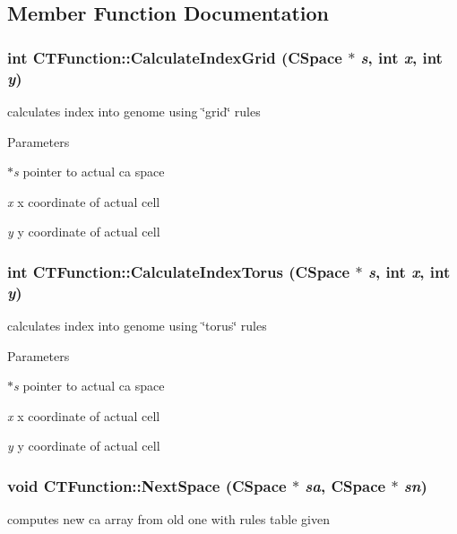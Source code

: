 \subsection{Member Function Documentation}
\hypertarget{classCTFunction_a337b7b2bc4aa55fba6966ed732292836}{
\subsubsection[{CalculateIndexGrid}]{\setlength{\rightskip}{0pt plus 5cm}int CTFunction::CalculateIndexGrid ({\bf CSpace} $\ast$ {\em s}, \/  int {\em x}, \/  int {\em y})}}
\label{classCTFunction_a337b7b2bc4aa55fba6966ed732292836}
calculates index into genome using \char`\"{}grid\char`\"{} rules


\begin{DoxyParams}{Parameters}
\item[{\em $\ast$s}]pointer to actual ca space \item[{\em x}]x coordinate of actual cell \item[{\em y}]y coordinate of actual cell \end{DoxyParams}
\hypertarget{classCTFunction_a46be389e8f79729395cb918ab58e63c0}{
\subsubsection[{CalculateIndexTorus}]{\setlength{\rightskip}{0pt plus 5cm}int CTFunction::CalculateIndexTorus ({\bf CSpace} $\ast$ {\em s}, \/  int {\em x}, \/  int {\em y})}}
\label{classCTFunction_a46be389e8f79729395cb918ab58e63c0}
calculates index into genome using \char`\"{}torus\char`\"{} rules


\begin{DoxyParams}{Parameters}
\item[{\em $\ast$s}]pointer to actual ca space \item[{\em x}]x coordinate of actual cell \item[{\em y}]y coordinate of actual cell \end{DoxyParams}
\hypertarget{classCTFunction_a7d961dbfd8759a0e71180c4112f33ffc}{
\subsubsection[{NextSpace}]{\setlength{\rightskip}{0pt plus 5cm}void CTFunction::NextSpace ({\bf CSpace} $\ast$ {\em sa}, \/  {\bf CSpace} $\ast$ {\em sn})}}
\label{classCTFunction_a7d961dbfd8759a0e71180c4112f33ffc}
computes new ca array from old one with rules table given


